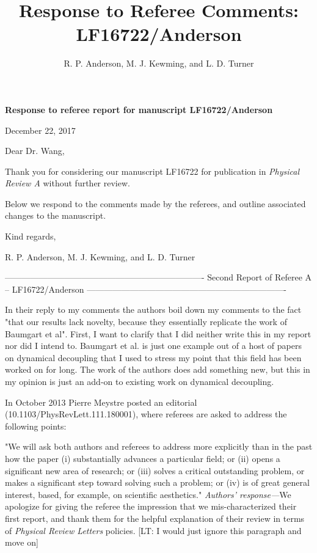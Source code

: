 \documentclass[letterpaper]{article}
\title{Response to Referee Comments: LF16722/Anderson}
\author{R. P. Anderson, M. J. Kewming, and L. D. Turner}
\newenvironment{refcomment}{\singlespacing\verbatim}{\endverbatim}
\newcommand{\response}{\emph{Authors' response---}}
\begin{document}

\textbf{Response to referee report for manuscript LF16722/Anderson}

December 22, 2017

Dear Dr. Wang,

Thank you for considering our manuscript LF16722 for publication in \textit{Physical Review A} without further review.

Below we respond to the comments made by the referees, and outline associated changes to the manuscript. 

Kind regards,

R. P. Anderson, M. J. Kewming, and L. D. Turner

\newpage
\begin{refcomment}
----------------------------------------------------------------------
Second Report of Referee A -- LF16722/Anderson
----------------------------------------------------------------------

In their reply to my comments the authors boil down my comments to the
fact "that our results lack novelty, because they
essentially replicate the work of Baumgart et al".
First, I want to clarify that I did neither write this in my report
nor did I intend to. Baumgart et al. is just one example out of a host
of papers on dynamical decoupling that I used to stress my point that
this field has been worked on for long. The work of the authors does
add something new, but this in my opinion is just an add-on to
existing work on dynamical decoupling.

In October 2013 Pierre Meystre posted an editorial
(10.1103/PhysRevLett.111.180001), where referees are asked to address
the following points:

"We will ask both authors and referees to address more explicitly than
in the past how the paper (i) substantially advances a particular
field; or (ii) opens a significant new area of research; or (iii)
solves a critical outstanding problem, or makes a significant step
toward solving such a problem; or (iv) is of great general interest,
based, for example, on scientific aesthetics."
\end{refcomment}
\response We apologize for giving the referee the impression that we mis-characterized their first report, and thank them for the helpful explanation of their review in terms of \textit{Physical Review Letters} policies.
[LT: I would just ignore this paragraph and move on]
\end{document}
